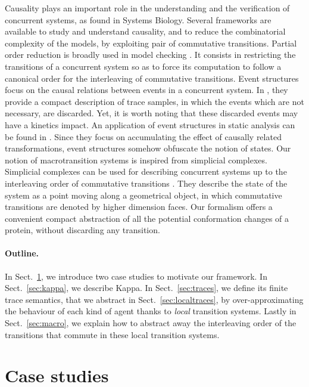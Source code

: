 \documentclass[10pt,a4paper]{llncs}
\begin{document}
Causality plays an important role in the understanding and the
verification of concurrent systems, as found in Systems Biology.
Several frameworks are available to study and understand causality,
and to reduce the combinatorial complexity of the models, by exploiting
pair of commutative transitions.
Partial order reduction is broadly used in model checking  \cite{DBLP:books/sp/Godefroid96}. It consists in restricting the transitions of a concurrent system so as to force its computation  to follow a canonical order for the interleaving of commutative transitions.
Event structures \cite{DBLP:conf/ac/Winskel86} focus on the
causal relations between events in a concurrent system.
In  \cite{DBLP:conf/fsttcs/DanosFFHH12}, they provide a compact description of trace samples, in which the events which are not necessary, are discarded. Yet, it is worth noting that these discarded events may have a kinetics impact. An application of event structures in static analysis can be found in \cite{CHJPS14-CMSB}. Since they focus on accumulating the effect of causally related transformations, event structures somehow obfuscate the notion of states. Our notion of macrotransition systems is inspired from simplicial complexes.
Simplicial complexes can be used for describing concurrent systems up to the interleaving order of commutative transitions \cite{DBLP:conf/concur/FajstrupGR98}. They describe the state of the system as a point moving along a geometrical object, in which commutative transitions  are denoted by higher dimension faces. Our formalism offers a convenient compact abstraction of all the potential conformation changes of a protein, without discarding any transition.


\paragraph{Outline. }
In Sect.~\ref{sec:casestudies}, we introduce two case studies to motivate our framework. In Sect.~\ref{sec:kappa}, we describe Kappa.  In Sect.~\ref{sec:traces}, we define its finite trace semantics, that we
abstract in Sect.~\ref{sec:localtraces}, by  over-approximating the behaviour of each kind of agent thanks to \emph{local} transition systems. Lastly in Sect.~\ref{sec:macro}, we explain how to abstract away the interleaving order of the transitions that commute in these local transition systems.



\section{Case studies}
\label{sec:casestudies}
\end{document}
